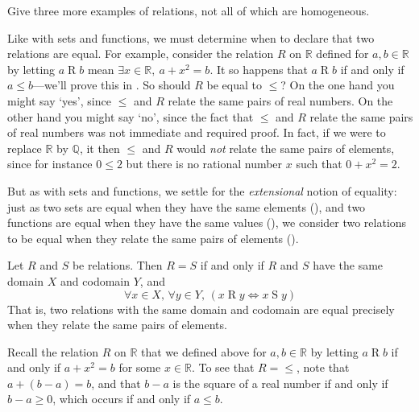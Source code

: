\begin{exercise}
Give three more examples of relations, not all of which are homogeneous.
\end{exercise}

Like with sets and functions, we must determine when to declare that two relations are equal. For example, consider the relation $R$ on $\mathbb{R}$ defined for $a,b \in \mathbb{R}$ by letting $a \mathrel{R} b$ mean $\exists x \in \mathbb{R},~ a+x^2=b$. It so happens that $a \mathbin{R} b$ if and only if $a \le b$---we'll prove this in . So should $R$ be equal to $\le$? On the one hand you might say `yes', since $\le$ and $R$ relate the same pairs of real numbers. On the other hand you might say `no', since the fact that $\le$ and $R$ relate the same pairs of real numbers was not immediate and required proof. In fact, if we were to replace $\mathbb{R}$ by $\mathbb{Q}$, it then $\le$ and $R$ would \textit{not} relate the same pairs of elements, since for instance $0 \le 2$ but there is no rational number $x$ such that $0+x^2=2$.

But as with sets and functions, we settle for the \textit{extensional} notion of equality: just as two sets are equal when they have the same elements (), and two functions are equal when they have the same values (), we consider two relations to be equal when they relate the same pairs of elements ().

\begin{axiom}
\label{axRelationEquality}
Let $R$ and $S$ be relations. Then $R = S$ if and only if $R$ and $S$ have the same domain $X$ and codomain $Y$, and
\[ \forall x \in X,\, \forall y \in Y,\, (x \mathrel{R} y \Leftrightarrow x \mathrel{S} y) \]
That is, two relations with the same domain and codomain are equal precisely when they relate the same pairs of elements.
\end{axiom}

\begin{example}
\label{exLeqOnRFromAddingSquare}
Recall the relation $R$ on $\mathbb{R}$ that we defined above for $a,b \in \mathbb{R}$ by letting $a \mathrel{R} b$ if and only if $a+x^2=b$ for some $x \in \mathbb{R}$. To see that $R = {\le}$, note that $a + (b-a) = b$, and that $b-a$ is the square of a real number if and only if $b-a \ge 0$, which occurs if and only if $a \le b$.
\end{example}

